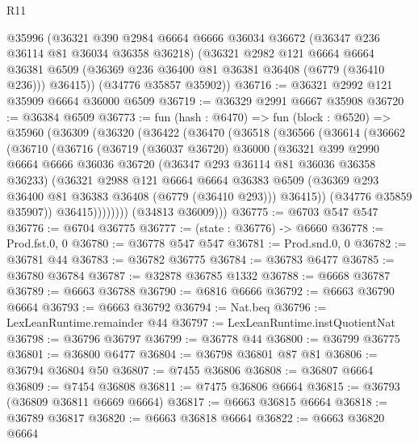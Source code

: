 \begin{lexlean}{R11}
\begin{coremodule}
      @35996
      (@36321
        @390
        @2984
        @6664
        @6666
        @36034
        @36672
        (@36347 @236 @36114 @81 @36034 @36358 @36218)
        (@36321
          @2982
          @121
          @6664
          @6664
          @36381
          @6509
          (@36369 @236 @36400 @81 @36381 @36408 (@6779 (@36410 @236)))
          @36415))
      (@34776 @35857 @35902))
@36716 := @36321 @2992 @121 @35909 @6664 @36000 @6509
@36719 := @36329 @2991 @6667 @35908
@36720 := @36384 @6509
@36773 := fun (hash : @6470) =>
  fun (block : @6520) =>
  @35960
    (@36309
      (@36320
        (@36422
          (@36470
            (@36518
              (@36566
                (@36614
                  (@36662
                    (@36710
                      (@36716
                        (@36719
                          (@36037 @36720)
                          @36000
                          (@36321
                            @399
                            @2990
                            @6664
                            @6666
                            @36036
                            @36720
                            (@36347 @293 @36114 @81 @36036 @36358 @36233)
                            (@36321
                              @2988
                              @121
                              @6664
                              @6664
                              @36383
                              @6509
                              (@36369 @293 @36400 @81 @36383 @36408 (@6779 (@36410 @293)))
                              @36415))
                          (@34776 @35859 @35907))
                        @36415))))))))
        (@34813 @36009)))
@36775 := @6703 @547 @547
@36776 := @6704 @36775
@36777 := (state : @36776) -> @6660
@36778 := Prod.fst.{0, 0}
@36780 := @36778 @547 @547
@36781 := Prod.snd.{0, 0}
@36782 := @36781 @44
@36783 := @36782 @36775
@36784 := @36783 @6477
@36785 := @36780 @36784
@36787 := @32878 @36785 @1332
@36788 := @6668 @36787
@36789 := @6663 @36788
@36790 := @6816 @6666
@36792 := @6663 @36790 @6664
@36793 := @6663 @36792
@36794 := Nat.beq
@36796 := LexLeanRuntime.remainder @44
@36797 := LexLeanRuntime.instQuotientNat
@36798 := @36796 @36797
@36799 := @36778 @44
@36800 := @36799 @36775
@36801 := @36800 @6477
@36804 := @36798 @36801 @87 @81
@36806 := @36794 @36804 @50
@36807 := @7455 @36806
@36808 := @36807 @6664
@36809 := @7454 @36808
@36811 := @7475 @36806 @6664
@36815 := @36793 (@36809 @36811 @6669 @6664)
@36817 := @6663 @36815 @6664
@36818 := @36789 @36817
@36820 := @6663 @36818 @6664
@36822 := @6663 @36820 @6664

\end{coremodule}
\end{lexlean}
